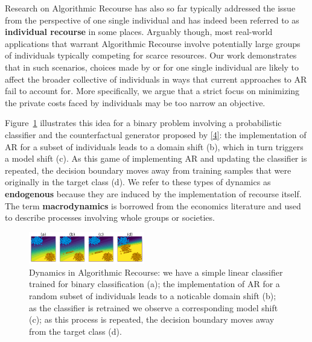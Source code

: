 \documentclass[
  conference]{IEEEtran}
\begin{document}
Research on Algorithmic Recourse has also so far typically addressed the
issue from the perspective of one single individual and has indeed been
referred to as \textbf{individual recourse} in some places. Arguably
though, most real-world applications that warrant Algorithmic Recourse
involve potentially large groups of individuals typically competing for
scarce resources. Our work demonstrates that in such scenarios, choices
made by or for one single individual are likely to affect the broader
collective of individuals in ways that current approaches to AR fail to
account for. More specifically, we argue that a strict focus on
minimizing the private costs faced by individuals may be too narrow an
objective.

Figure~\ref{fig-poc} illustrates this idea for a binary problem
involving a probabilistic classifier and the counterfactual generator
proposed by \protect\hyperlink{ref-wachter2017counterfactual}{{[}4{]}}:
the implementation of AR for a subset of individuals leads to a domain
shift (b), which in turn triggers a model shift (c). As this game of
implementing AR and updating the classifier is repeated, the decision
boundary moves away from training samples that were originally in the
target class (d). We refer to these types of dynamics as
\textbf{endogenous} because they are induced by the implementation of
recourse itself. The term \textbf{macrodynamics} is borrowed from the
economics literature and used to describe processes involving whole
groups or societies.

\begin{figure}

{\centering \includegraphics[width=0.45\textwidth,height=\textheight]{www/poc.png}

}

\caption{\label{fig-poc}Dynamics in Algorithmic Recourse: we have a
simple linear classifier trained for binary classification (a); the
implementation of AR for a random subset of individuals leads to a
noticable domain shift (b); as the classifier is retrained we observe a
corresponding model shift (c); as this process is repeated, the decision
boundary moves away from the target class (d).}

\end{figure}
\end{document}
